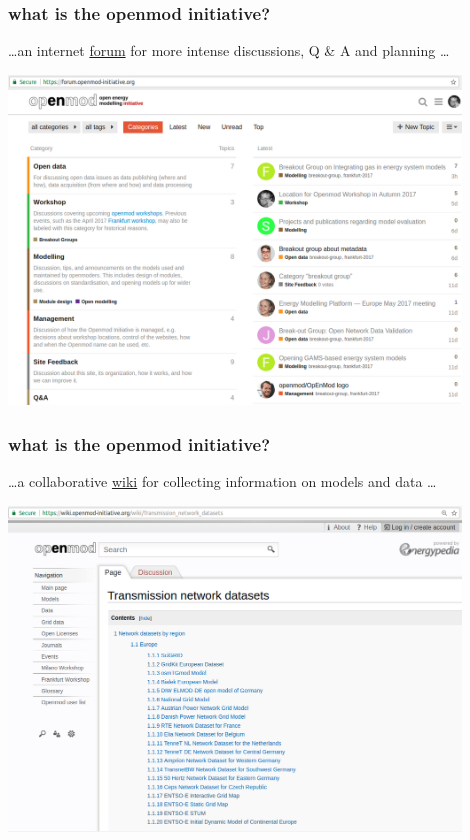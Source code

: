 \documentclass[12pt,aspectratio=169]{beamer}
\begin{document}
\begin{frame}
  \frametitle{what is the openmod initiative?}

  \dots an internet \alert{\href{https://forum.openmod-initiative.org/}{forum}} for more intense discussions, Q \& A and planning \dots

  \centering
  \includegraphics[width=12cm]{openmod-forum}

\end{frame}


\begin{frame}
  \frametitle{what is the openmod initiative?}

  \dots a collaborative \alert{\href{https://wiki.openmod-initiative.org/}{wiki}} for collecting information on models and data \dots

  \centering
  \includegraphics[width=12cm]{openmod-wiki}

\end{frame}
\end{document}
